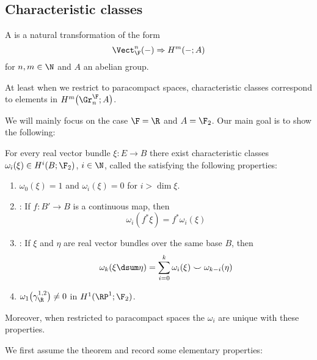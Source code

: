 \subsection{Characteristic classes}
\begin{definition}
	A  is a natural transformation of the form
	\begin{equation*}
		\Vect_{\F}^n({{-}}) \Rightarrow H^m({{-}}; A)
	\end{equation*}
	for $n, m \in \N$ and $A$ an abelian group.
\end{definition}
\begin{remark}
	At least when we restrict to paracompact spaces, characteristic classes correspond to elements in $H^m\big(\Gr^{\F}_n; A\big)$.
\end{remark}
We will mainly focus on the case $\F = \R$ and $A = \F_2$.
Our main goal is to show the following:
\begin{theorem}\label{thm:existenceofswclasses}
	For every real vector bundle $\xi\colon E \to B$ there exist characteristic classes $\omega_i(\xi) \in H^i(B; \F_2)$, $i \in \N$, called the  satisfying the following properties:
	\begin{enumerate}
		\item\label{ax:stiefwhittriviality} $\omega_0(\xi) = 1$ and $\omega_i(\xi) = 0$ for $i > \dim \xi$.
		\item {}:
			If $f\colon B' \to B$ is a continuous map, then
			\begin{equation*}
				\omega_i(f^* \xi) = f^* \omega_i(\xi)
			\end{equation*}
		\item\label{ax:whitneyproduct} :
			If $\xi$ and $\eta$ are real vector bundles over the same base $B$, then
			\begin{equation*}
				\omega_k(\xi \dsum \eta) = \sum_{i = 0}^k \omega_i(\xi) \smile \omega_{k - i}(\eta)
			\end{equation*}
		\item\label{ax:stiefwhitnormalization} $\omega_1\big(\gamma_{\R}^{1, 2}\big) \neq 0$ in $H^1(\RP^1; \F_2)$.
	\end{enumerate}
	Moreover, when restricted to paracompact spaces the $\omega_i$ are unique with these properties.
\end{theorem}
We first assume the theorem and record some elementary properties:
